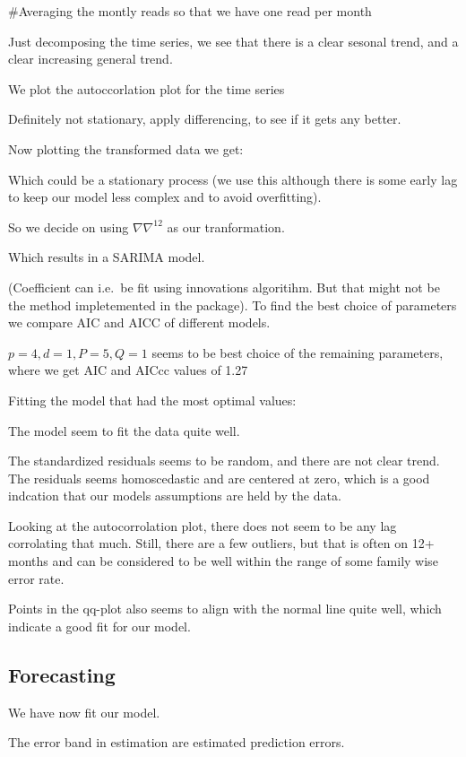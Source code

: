\documentclass[]{article}
\begin{document}
\#Averaging the montly reads so that we have one read per month

Just decomposing the time series, we see that there is a clear sesonal
trend, and a clear increasing general trend.

We plot the autoccorlation plot for the time series

Definitely not stationary, apply differencing, to see if it gets any
better.

Now plotting the transformed data we get:

Which could be a stationary process (we use this although there is some
early lag to keep our model less complex and to avoid overfitting).

So we decide on using \(\nabla\nabla^{12}\) as our tranformation.

Which results in a SARIMA model.

(Coefficient can i.e.~be fit using innovations algoritihm. But that
might not be the method impletemented in the package). To find the best
choice of parameters we compare AIC and AICC of different models.

\(p=4, d=1, P=5, Q=1\) seems to be best choice of the remaining
parameters, where we get AIC and AICcc values of 1.27

Fitting the model that had the most optimal values:

The model seem to fit the data quite well.

The standardized residuals seems to be random, and there are not clear
trend. The residuals seems homoscedastic and are centered at zero, which
is a good indcation that our models assumptions are held by the data.

Looking at the autocorrolation plot, there does not seem to be any lag
corrolating that much. Still, there are a few outliers, but that is
often on 12+ months and can be considered to be well within the range of
some family wise error rate.

Points in the qq-plot also seems to align with the normal line quite
well, which indicate a good fit for our model.

\hypertarget{forecasting}{%
\subsection{Forecasting}\label{forecasting}}

We have now fit our model.

The error band in estimation are estimated prediction errors.
\end{document}
